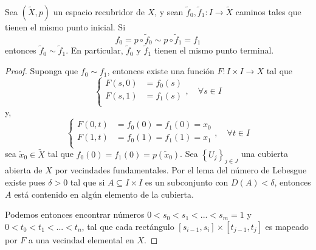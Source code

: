 \documentclass[12pt]{report}
\theoremstyle{largebreak}
\newcommand\cf[3]{\ensuremath{#1:#2\rightarrow#3}}
\begin{document}
    \begin{lema}
        \label{lemaF2}
        Sea $(\widetilde{X},p)$ un espacio recubridor de $X$, y sean $\cf{\widetilde{f}_0,\widetilde{f}_1}{I}{\widetilde{X}}$ caminos tales que tienen el mismo punto inicial. Si
        \begin{equation*}
            f_0=p\circ\widetilde{f}_0\sim p\circ\widetilde{f}_1=f_1
        \end{equation*}
        entonces $\widetilde{f}_0\sim\widetilde{f}_1$. En particular, $\widetilde{f}_0$ y $\widetilde{f}_1$ tienen el mismo punto terminal.
    \end{lema}

    \begin{proof}
        Suponga que $f_0\sim f_1$, entonces existe una función $\cf{F}{I\times I}{X}$ tal que
        \begin{equation*}
            \left\{
                \begin{split}
                    F(s,0) & = f_0(s) \\
                    F(s,1) & = f_1(s) \\
                \end{split}
            \right.,\quad\forall s\in I
        \end{equation*}
        y,
        \begin{equation*}
            \left\{
                \begin{split}
                    F(0,t) & = f_0(0)=f_1(0)=x_0 \\
                    F(1,t) & = f_0(1)=f_1(1)=x_1 \\
                \end{split}
            \right.,\quad\forall t\in I
        \end{equation*}
        sea $\widetilde{x}_0\in\widetilde{X}$ tal que $f_0(0)=f_1(0)=p(\widetilde{x}_0)$. Sea $\left\{U_j \right\}_{ j\in J}$ una cubierta abierta de $X$ por vecindades fundamentales. Por el lema del número de Lebesgue existe pues $\delta>0$ tal que si $A\subseteq I\times I$ es un subconjunto con $D(A)<\delta$, entonces $A$ está contenido en algún elemento de la cubierta.

        Podemos entonces encontrar números $0<s_0<s_1<...<s_m=1$ y $0<t_0<t_1<...<t_n$, tal que cada rectángulo $[s_{ i-1},s_i]\times [t_{ j-1},t_j]$ es mapeado por $F$ a una vecindad elemental en $X$.


\end{proof}
\end{document}
